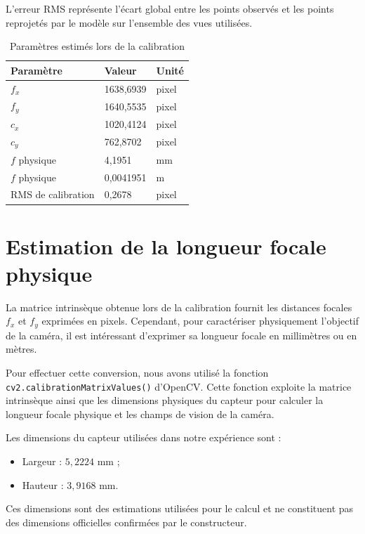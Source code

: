 \documentclass[12pt,a4paper]{report}
\begin{document}
L'erreur RMS représente l'écart global entre les points observés et les points reprojetés par le modèle sur l'ensemble des vues utilisées.

\begin{table}[H]
\centering
\caption{Paramètres estimés lors de la calibration}
\label{tab:parametres-calibration}
\begin{tabular}{lll}
\toprule
\textbf{Paramètre} & \textbf{Valeur} & \textbf{Unité} \\
\midrule
$f_x$ & 1638,6939 & pixel \\
$f_y$ & 1640,5535 & pixel \\
$c_x$ & 1020,4124 & pixel \\
$c_y$ & 762,8702 & pixel \\
$f$ physique & 4,1951 & mm \\
$f$ physique & 0,0041951 & m \\
\midrule
RMS de calibration & 0,2678 & pixel \\
\bottomrule
\end{tabular}
\end{table}


\section{Estimation de la longueur focale physique}

La matrice intrinsèque obtenue lors de la calibration fournit les distances focales
$f_x$ et $f_y$ exprimées en pixels. Cependant, pour caractériser physiquement
l'objectif de la caméra, il est intéressant d'exprimer sa longueur focale en
millimètres ou en mètres.

Pour effectuer cette conversion, nous avons utilisé la fonction
\texttt{cv2.calibrationMatrixValues()} d'OpenCV. Cette fonction exploite la
matrice intrinsèque ainsi que les dimensions physiques du capteur pour calculer
la longueur focale physique et les champs de vision de la caméra.

Les dimensions du capteur utilisées dans notre expérience sont :
\begin{itemize}
    \item Largeur : $5{,}2224$ mm ;
    \item Hauteur : $3{,}9168$ mm.
\end{itemize}

Ces dimensions sont des estimations utilisées pour le calcul et ne constituent
pas des dimensions officielles confirmées par le constructeur.
\end{document}
